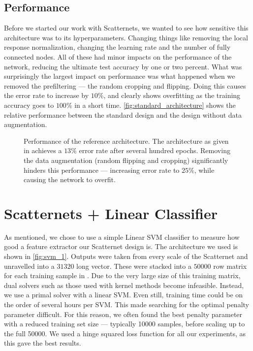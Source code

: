 \subsection{Performance}\label{sec:pre_filtering_effects}
  Before we started our work with Scatternets, we wanted to see how sensitive
  this architecture was to its hyperparameters. Changing things like removing
  the local response normalization, changing the learning rate and the number
  of fully connected nodes. All of these had minor impacts on the performance
  of the network, reducing the ultimate test accuracy by one or two percent.
  What was surprisingly the largest impact on performance was what happened
  when we removed the prefiltering --- the random cropping and flipping. Doing
  this causes the error rate to increase by $10\%$, and clearly shows
  overfitting as the training accuracy goes to $100\%$ in a short time.
  \autoref{fig:standard_architecture} shows the relative performance between
  the standard design and the design without data augmentation.

  \begin{figure}
    \centering
    \caption[Performance of the reference architecture]
            {Performance of the reference architecture. The architecture as
            given in \citep{krizhevsky_cuda_2014} achieves a $13\%$ error rate
            after several hundred epochs. Removing the data augmentation
            (random flipping and cropping) significantly hinders this
            performance --- increasing error rate to $25\%$, 
            while causing the network to overfit.}
    \label{fig:standard_architecture}
  \end{figure}

\section{Scatternets + Linear Classifier}
  As mentioned, we chose to use a simple Linear SVM classifier to measure how
  good a feature extractor our Scatternet design is. The architecture we used
  is shown in \autoref{fig:svm_1}. Outputs were taken from every scale of the
  Scatternet and unravelled into a $31320$ long vector. These were stacked into
  a $50000$ row matrix for each training sample in \cifar. Due to the very
  large size of this training matrix, dual solvers such as those used with
  kernel methods become infeasible. Instead, we use a primal solver with
  a linear SVM\@. Even still, training time could be on the order of several hours
  per SVM\@. This made searching for the optimal penalty parameter difficult. For
  this reason, we often found the best penalty parameter with a reduced
  training set size --- typically 10000 samples, before scaling up to the full
  50000. We used a hinge squared loss function for all our experiments, as this
  gave the best results.

